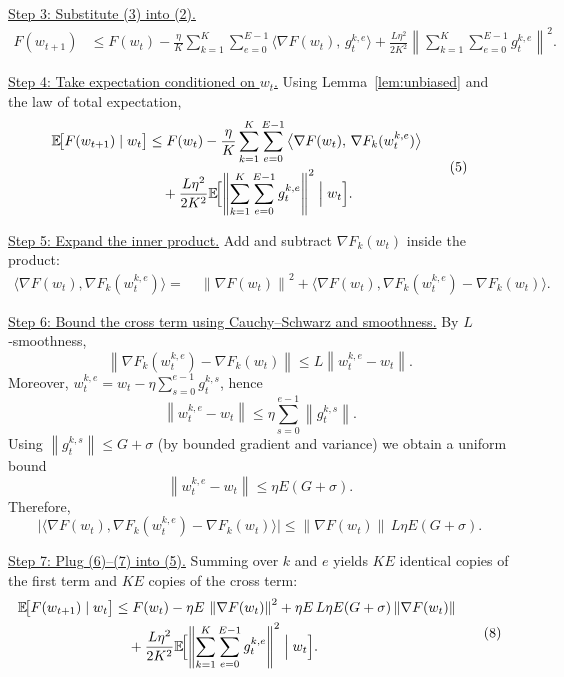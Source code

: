 \documentclass{article}
\newcommand{\E}{\mathbb{E}}
\newcommand{\norm}[1]{\left\|#1\right\|}
\begin{document}
\noindent\underline{Step 3: Substitute (3) into (2).}  
\[
\begin{aligned}
F(w_{t+1}) &\le F(w_t) 
-\frac{\eta}{K}\sum_{k=1}^K\sum_{e=0}^{E-1}
\big\langle\nabla F(w_t),\,g_{t}^{k,e}\big\rangle
+\frac{L\eta^2}{2K^2}\norm{\sum_{k=1}^K\sum_{e=0}^{E-1} g_{t}^{k,e}}^2 .
\end{aligned}
\tag{4}
\]

\noindent\underline{Step 4: Take expectation conditioned on $w_t$.}  
Using Lemma~\ref{lem:unbiased} and the law of total expectation,
\[
\begin{aligned}
\E\!\bigl[F(w_{t+1})\mid w_t\bigr]
&\le F(w_t)
-\frac{\eta}{K}\sum_{k=1}^K\sum_{e=0}^{E-1}
\big\langle\nabla F(w_t),\,\nabla F_k(w_{t}^{k,e})\big\rangle\\
&\quad+\frac{L\eta^2}{2K^2}
\E\!\Bigl[\norm{\sum_{k=1}^K\sum_{e=0}^{E-1} g_{t}^{k,e}}^2\Bigm|w_t\Bigr].
\end{aligned}
\tag{5}
\]

\noindent\underline{Step 5: Expand the inner product.}  
Add and subtract $\nabla F_k(w_t)$ inside the product:
\[
\begin{aligned}
\big\langle\nabla F(w_t),\nabla F_k(w_{t}^{k,e})\big\rangle
=&\;\norm{\nabla F(w_t)}^2
+\big\langle\nabla F(w_t),\nabla F_k(w_{t}^{k,e})-\nabla F_k(w_t)\big\rangle .
\end{aligned}
\tag{6}
\]

\noindent\underline{Step 6: Bound the cross term using Cauchy–Schwarz and smoothness.}  
By $L$‑smoothness,
\[
\norm{\nabla F_k(w_{t}^{k,e})-\nabla F_k(w_t)}\le L\norm{w_{t}^{k,e}-w_t}.
\]
Moreover, $w_{t}^{k,e}=w_t-\eta\sum_{s=0}^{e-1} g_{t}^{k,s}$, hence
\[
\norm{w_{t}^{k,e}-w_t}\le \eta\sum_{s=0}^{e-1}\norm{g_{t}^{k,s}}.
\]
Using $\norm{g_{t}^{k,s}}\le G+\sigma$ (by bounded gradient and variance) we obtain a uniform bound
\[
\norm{w_{t}^{k,e}-w_t}\le \eta E(G+\sigma).
\]
Therefore,
\[
\big|\big\langle\nabla F(w_t),\nabla F_k(w_{t}^{k,e})-\nabla F_k(w_t)\big\rangle\big|
\le \norm{\nabla F(w_t)}\,L\eta E(G+\sigma).
\tag{7}
\]

\noindent\underline{Step 7: Plug (6)–(7) into (5).}  
Summing over $k$ and $e$ yields $KE$ identical copies of the first term and $KE$ copies of the cross term:
\[
\begin{aligned}
\E\!\bigl[F(w_{t+1})\mid w_t\bigr]
&\le F(w_t)
-\eta E\,\norm{\nabla F(w_t)}^2
+ \eta E\,L\eta E(G+\sigma)\norm{\nabla F(w_t)} \\
&\quad+\frac{L\eta^2}{2K^2}
\E\!\Bigl[\norm{\sum_{k=1}^K\sum_{e=0}^{E-1} g_{t}^{k,e}}^2\Bigm|w_t\Bigr].
\end{aligned}
\tag{8}
\]
\end{document}
